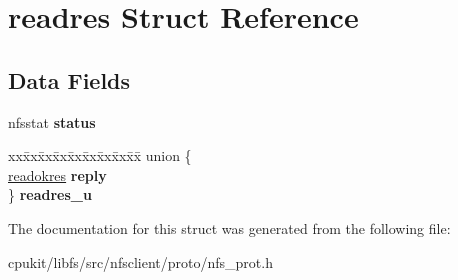 \hypertarget{structreadres}{}\section{readres Struct Reference}
\label{structreadres}
\subsection*{Data Fields}
\begin{DoxyCompactItemize}
\item 
\mbox{\label{structreadres_a2f9aa728f35fa795a8c9b751f316b1bb}} 
nfsstat {\bfseries status}
\item 
\mbox{\label{structreadres_a51a4e1b105d4359cae9baa2aeaa16bd9}} 
\begin{tabbing}
xx\=xx\=xx\=xx\=xx\=xx\=xx\=xx\=xx\=\kill
union \{\\
\>\mbox{\hyperlink{structreadokres}{readokres}} {\bfseries reply}\\
\} {\bfseries readres\_u}\\

\end{tabbing}\end{DoxyCompactItemize}


The documentation for this struct was generated from the following file\+:\begin{DoxyCompactItemize}
\item 
cpukit/libfs/src/nfsclient/proto/nfs\+\_\+prot.\+h\end{DoxyCompactItemize}
